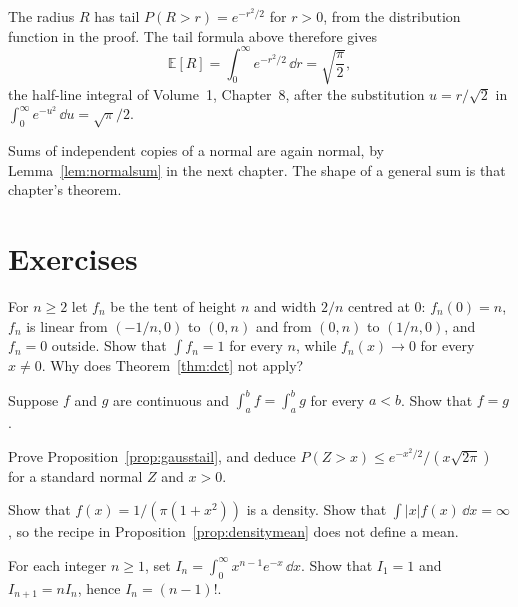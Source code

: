 The radius $R$ has tail $P(R>r)=e^{-r^2/2}$ for $r>0$, from the distribution function in the proof. The tail formula above therefore gives
\[
 \mathbb E[R]=\int_0^{\infty}e^{-r^2/2}\,\dd r=\sqrt{\frac{\pi}{2}},
\]
the half-line integral of Volume~1, Chapter~8, after the substitution $u=r/\sqrt{2}$ in $\int_0^{\infty}e^{-u^2}\,\dd u=\sqrt{\pi}/2$.

Sums of independent copies of a normal are again normal, by Lemma~\ref{lem:normalsum} in the next chapter. The shape of a general sum is that chapter's theorem.



\section{Exercises}

\begin{exercise}[$\star$]\label{ex:counter}
For $n\ge2$ let $f_n$ be the tent of height $n$ and width $2/n$ centred at $0$: $f_n(0)=n$, $f_n$ is linear from $(-1/n,0)$ to $(0,n)$ and from $(0,n)$ to $(1/n,0)$, and $f_n=0$ outside. Show that $\int f_n=1$ for every $n$, while $f_n(x)\to0$ for every $x\ne0$. Why does Theorem~\ref{thm:dct} not apply?
\end{exercise}

\begin{exercise}[$\star$]\label{ex:densityunique}
Suppose $f$ and $g$ are continuous and $\int_a^b f=\int_a^b g$ for every $a<b$. Show that $f=g$.
\end{exercise}

\begin{exercise}[$\star\star$]\label{ex:tail}
Prove Proposition~\ref{prop:gausstail}, and deduce $P(Z>x)\le e^{-x^2/2}/(x\sqrt{2\pi})$ for a standard normal $Z$ and $x>0$.
\end{exercise}

\begin{exercise}[$\star\star$]\label{ex:cauchy}
Show that $f(x)=1/(\pi(1+x^2))$ is a density. Show that $\int |x|f(x)\,\dd x=\infty$, so the recipe in Proposition~\ref{prop:densitymean} does not define a mean.
\end{exercise}

\begin{exercise}[$\star\star$]\label{ex:gamma}
For each integer $n\ge1$, set $I_n=\int_0^{\infty}x^{n-1}e^{-x}\,\dd x$. Show that $I_1=1$ and $I_{n+1}=n I_n$, hence $I_n=(n-1)!$.
\end{exercise}

